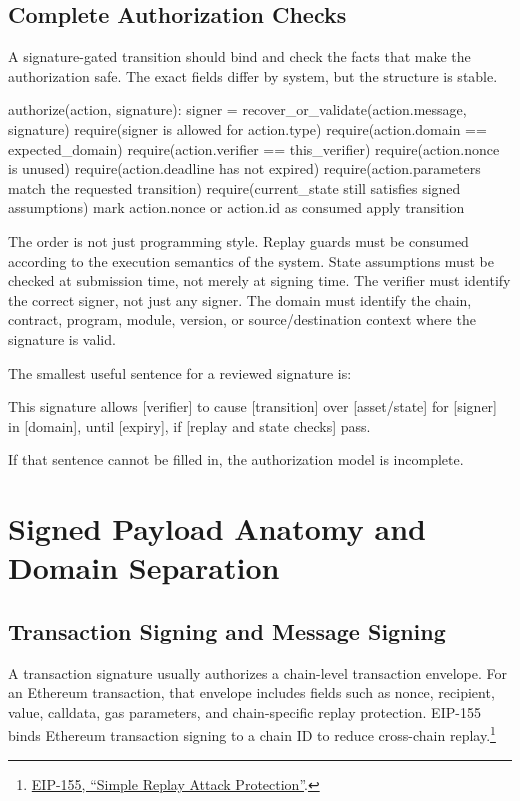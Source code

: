 \subsection{Complete Authorization Checks}

A signature-gated transition should bind and check the facts that make the authorization safe. The exact fields differ by system, but the structure is stable.

\begin{codeblock}
authorize(action, signature):
    signer = recover_or_validate(action.message, signature)
    require(signer is allowed for action.type)
    require(action.domain == expected_domain)
    require(action.verifier == this_verifier)
    require(action.nonce is unused)
    require(action.deadline has not expired)
    require(action.parameters match the requested transition)
    require(current_state still satisfies signed assumptions)
    mark action.nonce or action.id as consumed
    apply transition
\end{codeblock}

The order is not just programming style. Replay guards must be consumed according to the execution semantics of the system. State assumptions must be checked at submission time, not merely at signing time. The verifier must identify the correct signer, not just any signer. The domain must identify the chain, contract, program, module, version, or source/destination context where the signature is valid.

The smallest useful sentence for a reviewed signature is:

\begin{codeblock}
This signature allows [verifier] to cause [transition]
over [asset/state] for [signer] in [domain],
until [expiry], if [replay and state checks] pass.
\end{codeblock}

If that sentence cannot be filled in, the authorization model is incomplete.

\section{Signed Payload Anatomy and Domain Separation}

\subsection{Transaction Signing and Message Signing}

A transaction signature usually authorizes a chain-level transaction envelope. For an Ethereum transaction, that envelope includes fields such as nonce, recipient, value, calldata, gas parameters, and chain-specific replay protection. EIP-155 binds Ethereum transaction signing to a chain ID to reduce cross-chain replay.\footnote{\href{https://eips.ethereum.org/EIPS/eip-155}{EIP-155, ``Simple Replay Attack Protection''}.}

